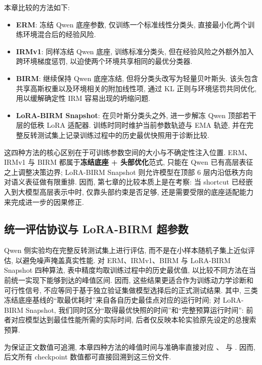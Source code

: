 \documentclass[a4paper,punct=banjiao,twoside]{ctexrep}
\theoremstyle{plain}
\theoremstyle{definition}
\theoremstyle{remark}
\begin{document}
本章比较的方法如下:
\begin{itemize}
    \item \textbf{ERM}: 冻结 Qwen 底座参数, 仅训练一个标准线性分类头, 直接最小化两个训练环境混合后的经验风险.
    \item \textbf{IRMv1}: 同样冻结 Qwen 底座, 训练标准分类头, 但在经验风险之外额外加入跨环境梯度惩罚, 以迫使两个环境共享相同的最优分类器.
    \item \textbf{BIRM}: 继续保持 Qwen 底座冻结, 但将分类头改写为轻量贝叶斯头. 该头包含共享高斯权重以及环境相关的附加线性项, 通过 KL 正则与环境惩罚共同优化, 用以缓解确定性 IRM 容易出现的坍缩问题.
    \item \textbf{LoRA-BIRM Snapshot}: 在贝叶斯分类头之外, 进一步解冻 Qwen 顶部若干层的低秩 LoRA 适配器. 训练时同时维护当前参数轨迹与 EMA 轨迹, 并在完整反转测试集上记录训练过程中的历史最优快照用于诊断比较.
\end{itemize}

这四种方法的核心区别在于可训练参数空间的大小与不确定性注入位置. ERM、IRMv1 与 BIRM 都属于\textbf{冻结底座 + 头部优化}范式, 只能在 Qwen 已有高层表征之上调整决策边界; LoRA-BIRM Snapshot 则允许模型在顶部 $6$ 层内沿低秩方向对语义表征做有限重排. 因而, 第七章的比较本质上是在考察: 当 shortcut 已经嵌入到大模型高层表示中时, 仅靠头部约束是否足够, 还是需要受限的底座适配能力来完成进一步的因果修正.

\subsection{统一评估协议与 LoRA-BIRM 超参数}

Qwen 侧实验均在完整反转测试集上进行评估, 而不是在小样本随机子集上近似评估, 以避免噪声掩盖真实性能. 对 ERM、IRMv1、BIRM 与 LoRA-BIRM Snapshot 四种算法, 表中精度均取训练过程中的历史最优值, 以比较不同方法在当前统一实现下能够到达的峰值区间. 因而, 这些结果更适合作为训练动力学诊断和可行性信号, 不应等同于基于独立验证集做模型选择后的正式测试结果. 其中, 三类冻结底座基线的“取最优耗时”来自各自历史最佳点对应的运行时间; 对 LoRA-BIRM Snapshot, 我们同时区分“取得最优快照的时间”和“完整预算运行时间”: 前者对应模型达到最佳性能所需的实际时间, 后者仅反映本轮实验原先设定的总搜索预算.

为保证正文数值可追溯, 本章四种方法的峰值时间与准确率直接对应 、 与 . 因而, 后文所有 checkpoint 数值都可直接回溯到这三份文件.
\end{document}
